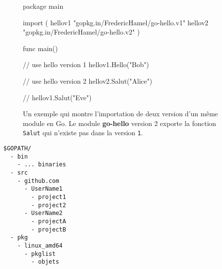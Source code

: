 \begin{figure}[h]
\begin{mplisting}{1}
package main

import (
  hellov1 "gopkg.in/FredericHamel/go-hello.v1"
  hellov2 "gopkg.in/FredericHamel/go-hello.v2"
)

func main() {
  // use hello version 1
  hellov1.Hello("Bob")

  // use hello version 2
  hellov2.Salut("Alice")

  // hellov1.Salut("Eve")
}
\end{mplisting}
  \caption{Un exemple qui montre l'importation de deux version d'un même module
    en Go. Le module \textbf{go-hello} version 2 exporte la fonction \texttt{Salut}
    qui n'existe pas dans la version \texttt{1}.}
\end{figure}


\begin{verbatim}
$GOPATH/
  - bin
    - ... binaries
  - src
    - github.com
      - UserName1
        - project1
        - project2
      - UserName2
        - projectA
        - projectB
  - pkg
    - linux_amd64
      - pkglist
        - objets
\end{verbatim}

